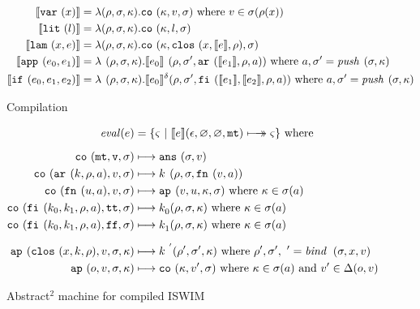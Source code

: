 \documentclass[preprint]{sigplanconf}
\begin{document}
\begin{figure}
\begin{align*}
\compile{\svar\mvar} &= \lambda(\menv,\msto,\mkont) .\co{\mkont,\mval,\msto} \text{ where }\mval\in\msto(\menv(\mvar))
\\
\compile{\slit\mlit} &= \lambda(\menv,\msto,\mkont) .
\co{\mkont,\mlit,\msto}
\\
\compile{\slam\mvar\mexp} &= \lambda(\menv,\msto,\mkont) .
\co{\mkont,\clos{\mvar,\compile\mexp,\menv},\msto}
\\
\compile{\sapp[^\mlab]{\mexpi0}{\mexpi1}} &= \lambda^\mcntr(\menv,\msto,\mkont) .
\compile{\mexpi0}^\mcntr(\menv,\msto',\kar[_\mlab^\mcntr]{\compile{\mexpi1},\menv,\maddr})
\text{ where }\maddr,\msto' = \mathit{push}^\mcntr_\mlab(\msto,\mkont)
\\
\compile{\sif[^\mlab]{\mexpi0}{\mexpi1}{\mexpi2}} &= \lambda^\mcntr(\menv,\msto,\mkont) .
\compile{\mexpi0}^\delta(\menv,\msto',\kif[^\mcntr]{\compile{\mexpi1},\compile{\mexpi2},\menv,\maddr})
\text{ where }\maddr,\msto' = \mathit{push}_\mlab^\mcntr(\msto,\mkont)
\end{align*}
\caption{Compilation}
\end{figure}

\begin{figure}
\begin{align*}
\mathit{eval}(\mexp) &= \{ \mstate\ |\ \compile{\mexp}(\epsilon,\varnothing,\varnothing,\kmt) \multimachstep \mstate \} \text{ where }
\\[2mm]
\co{\kmt,\mval,\msto} &\machstep
\ans{\msto,\mval}
\\
\co{\kar[^\mcntr_\mlab]{\mcomp,\menv,\maddr},\mval,\msto} & \machstep
\mcomp^\mcntr(\menv,\msto,\kfn[^\mcntr_\mlab]{\mval,\maddr})
\\
\co{\kfn[^\mcntr_\mlab]{{\mvalx{u}},\maddr},\mval,\msto} & \machstep
\ap[^\mcntr_\mlab]{\mval,\mvalx{u},\mkont,\msto}
\text{ where }\mkont \in \msto(\maddr)
\\
\co{\kif[^\mcntr]{\mcompi0,\mcompi1,\menv,\maddr},\strue,\msto} & \machstep
\mcompi0^\mcntr(\menv,\msto,\mkont)
\text{ where }\mkont\in\msto(\maddr)
\\
\co{\kif[^\mcntr]{\mcompi0,\mcompi1,\menv,\maddr},\sfalse,\msto} & \machstep
\mcompi1^\mcntr(\menv,\msto,\mkont)
\text{ where }\mkont\in\msto(\maddr)
\\[2mm]
\ap[^\mcntr_\mlab]{\clos{\mvar,\mcomp,\menv},\mval,\msto,\mkont} & \machstep
\mcomp^{\mcntr'}(\menv',\msto',\mkont)
\text{ where }\menv',\msto',\mcntr' = \mathit{bind\,}^{ \mcntr}_\mlab(\msto,\mvar,\mval)
\\
\ap{\mop,\mval,\msto,\mkont} & \machstep
\co{\mkont,\mval',\msto}
\text{ where }\mkont\in\msto(\maddr)
\text{ and } \mval'\in\interpdelta(\mop,\mval)
\end{align*}
\caption{Abstract$^2$ machine for compiled ISWIM}
\label{fig:caam}
\end{figure}
\end{document}
